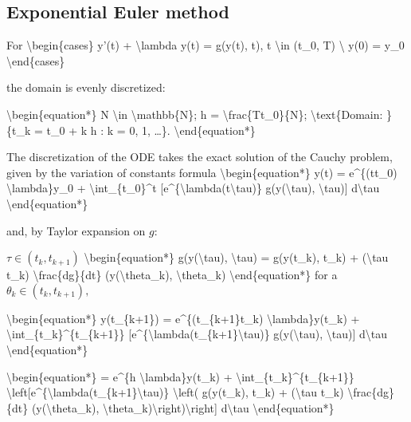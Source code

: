 \documentclass[letterpaper,10pt,english]{jupyterBook}
\begin{document}
\subsection{Exponential Euler method}
\label{\detokenize{cap4:exponential-euler-method}}
\sphinxAtStartPar
For
\textbackslash{}begin\{cases\}
y’(t) + \textbackslash{}lambda y(t) = g(y(t), t), t \textbackslash{}in (t\_0, T) \textbackslash{}
y(0) = y\_0
\textbackslash{}end\{cases\}

\sphinxAtStartPar
the domain is evenly discretized:

\sphinxAtStartPar
\textbackslash{}begin\{equation*\}
N \textbackslash{}in \textbackslash{}mathbb\{N\}; h = \textbackslash{}frac\{T\sphinxhyphen{}t\_0\}\{N\}; \textbackslash{}text\{Domain: \}\{t\_k = t\_0 + k h : k = 0, 1, …\}.
\textbackslash{}end\{equation*\}

\sphinxAtStartPar
The discretization of the ODE takes the exact solution of the Cauchy problem, given by the variation of constants formula
\textbackslash{}begin\{equation*\}
y(t) = e\textasciicircum{}\{\sphinxhyphen{}(t\sphinxhyphen{}t\_0) \textbackslash{}lambda\}y\_0 + \textbackslash{}int\_\{t\_0\}\textasciicircum{}t {[}e\textasciicircum{}\{\sphinxhyphen{}\textbackslash{}lambda(t\sphinxhyphen{}\textbackslash{}tau)\} g(y(\textbackslash{}tau), \textbackslash{}tau){]} d\textbackslash{}tau
\textbackslash{}end\{equation*\}

\sphinxAtStartPar
and, by Taylor expansion on \(g\):

\sphinxAtStartPar
\(\tau \in (t_k, t_{k+1})\)
\textbackslash{}begin\{equation*\}
g(y(\textbackslash{}tau), \textbackslash{}tau) = g(y(t\_k), t\_k) + (\textbackslash{}tau \sphinxhyphen{} t\_k) \textbackslash{}frac\{dg\}\{dt\} (y(\textbackslash{}theta\_k), \textbackslash{}theta\_k)
\textbackslash{}end\{equation*\}
for a \(\theta_k \in (t_k, t_{k+1}),\)

\sphinxAtStartPar
\textbackslash{}begin\{equation*\}
y(t\_\{k+1\}) = e\textasciicircum{}\{\sphinxhyphen{}(t\_\{k+1\}\sphinxhyphen{}t\_k) \textbackslash{}lambda\}y(t\_k) + \textbackslash{}int\_\{t\_k\}\textasciicircum{}\{t\_\{k+1\}\} {[}e\textasciicircum{}\{\sphinxhyphen{}\textbackslash{}lambda(t\_\{k+1\}\sphinxhyphen{}\textbackslash{}tau)\} g(y(\textbackslash{}tau), \textbackslash{}tau){]} d\textbackslash{}tau
\textbackslash{}end\{equation*\}

\sphinxAtStartPar
\textbackslash{}begin\{equation*\}
= e\textasciicircum{}\{\sphinxhyphen{}h \textbackslash{}lambda\}y(t\_k) + \textbackslash{}int\_\{t\_k\}\textasciicircum{}\{t\_\{k+1\}\} \textbackslash{}left{[}e\textasciicircum{}\{\sphinxhyphen{}\textbackslash{}lambda(t\_\{k+1\}\sphinxhyphen{}\textbackslash{}tau)\} \textbackslash{}left( g(y(t\_k), t\_k) + (\textbackslash{}tau \sphinxhyphen{} t\_k) \textbackslash{}frac\{dg\}\{dt\} (y(\textbackslash{}theta\_k), \textbackslash{}theta\_k)\textbackslash{}right)\textbackslash{}right{]} d\textbackslash{}tau
\textbackslash{}end\{equation*\}
\end{document}

